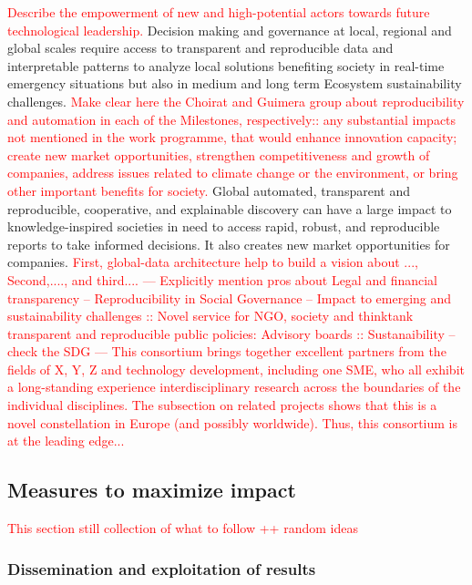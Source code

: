 \documentclass[11pt, a4paper]{article} %
\begin{document}
{\textcolor{red}{Describe the empowerment of new and high-potential
  actors towards future technological leadership.}  Decision making
and governance at local, regional and global scales require access to
transparent and reproducible data and interpretable patterns to
analyze local solutions benefiting society in real-time emergency
situations but also in medium and long term Ecosystem sustainability
challenges. \textcolor{red}{Make clear here the Choirat and Guimera
  group about reproducibility and automation in each of the
  Milestones, respectively:: any substantial impacts not mentioned in
  the work programme, that would enhance innovation capacity; create
  new market opportunities, strengthen competitiveness and growth of
  companies, address issues related to climate change or the
  environment, or bring other important benefits for society.} Global
automated, transparent and reproducible, cooperative, and explainable
discovery can have a large impact to knowledge-inspired societies in
need to access rapid, robust, and reproducible reports to take
informed decisions. It also creates new market opportunities for
companies. \textcolor{red}{First, global-data architecture help to
  build a vision about ..., Second,...., and third.... --- Explicitly
  mention pros about Legal and financial transparency --
  Reproducibility in Social Governance -- Impact to emerging and
  sustainability challenges :: Novel service for NGO, society and
  thinktank transparent and reproducible public policies: Advisory
  boards :: Sustanaibility -- check the SDG --- This consortium brings
  together excellent partners from the fields of X, Y, Z and
  technology development, including one SME, who all exhibit a
  long-standing experience interdisciplinary research across the
  boundaries of the individual disciplines. The subsection on related
  projects shows that this is a novel constellation in Europe (and
  possibly worldwide). Thus, this consortium is at the leading
  edge...}

\subsection{Measures to maximize impact} 
\label{sec:maximize-impact}

\textcolor{red}{This section still collection of what to follow ++
  random ideas}

\subsubsection{Dissemination and exploitation of results}

}
\end{document}
